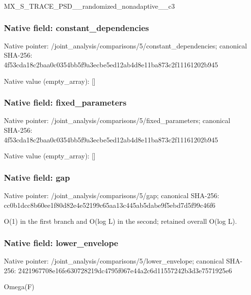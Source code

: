 \documentclass[10pt,a4paper]{article}
\begin{document}
\begingroup\raggedright\sloppy MX\_\allowbreak{}S\_\allowbreak{}TRACE\_\allowbreak{}PSD\_\allowbreak{}\_\allowbreak{}randomized\_\allowbreak{}nonadaptive\_\allowbreak{}\_\allowbreak{}c3\par\endgroup

\subsubsection{Native field: constant\_\allowbreak{}dependencies}
Native pointer: /joint\_\allowbreak{}analysis/comparisons/5/constant\_\allowbreak{}dependencies; canonical SHA-256: 4f53cda18c2baa0c0354bb5f9a3ecbe5ed12ab4d8e11ba873c2f11161202b945

Native value (empty\_\allowbreak{}array): []

\subsubsection{Native field: fixed\_\allowbreak{}parameters}
Native pointer: /joint\_\allowbreak{}analysis/comparisons/5/fixed\_\allowbreak{}parameters; canonical SHA-256: 4f53cda18c2baa0c0354bb5f9a3ecbe5ed12ab4d8e11ba873c2f11161202b945

Native value (empty\_\allowbreak{}array): []

\subsubsection{Native field: gap}
Native pointer: /joint\_\allowbreak{}analysis/comparisons/5/gap; canonical SHA-256: cc0b1dcc8b60ee1f80d82e4e52199c65aa13c445ab5dabe9f5ebd7d5f99c46f6

\begingroup\raggedright\sloppy O(1) in the first branch and O(log L) in the second;\allowbreak{} retained overall O(log L).\par\endgroup

\subsubsection{Native field: lower\_\allowbreak{}envelope}
Native pointer: /joint\_\allowbreak{}analysis/comparisons/5/lower\_\allowbreak{}envelope; canonical SHA-256: 2421967708e16fe630728219dc4795f067e44a2c6d11557242b3d3e7571925e6

\begingroup\raggedright\sloppy Omega(F)\par\endgroup
\end{document}
